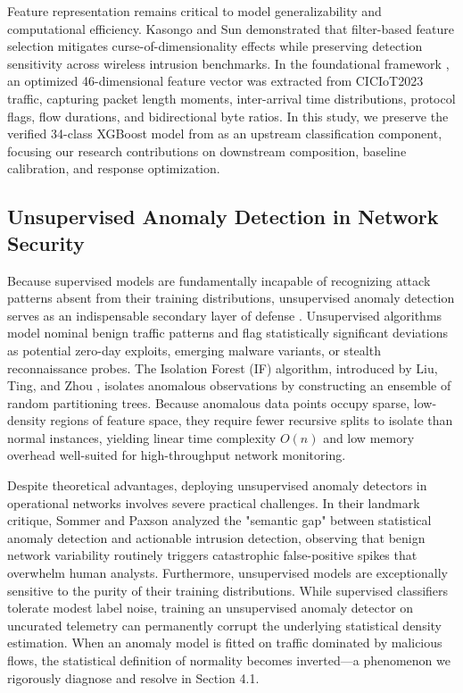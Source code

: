 \documentclass[journal,10pt,onecolumn]{IEEEtran}
\begin{document}
Feature representation remains critical to model generalizability and computational efficiency. Kasongo and Sun \cite{23} demonstrated that filter-based feature selection mitigates curse-of-dimensionality effects while preserving detection sensitivity across wireless intrusion benchmarks. In the foundational framework \cite{1}, an optimized 46-dimensional feature vector was extracted from CICIoT2023 traffic, capturing packet length moments, inter-arrival time distributions, protocol flags, flow durations, and bidirectional byte ratios. In this study, we preserve the verified 34-class XGBoost model from \cite{1} as an upstream classification component, focusing our research contributions on downstream composition, baseline calibration, and response optimization.


\subsection{Unsupervised Anomaly Detection in Network Security}
Because supervised models are fundamentally incapable of recognizing attack patterns absent from their training distributions, unsupervised anomaly detection serves as an indispensable secondary layer of defense \cite{15}. Unsupervised algorithms model nominal benign traffic patterns and flag statistically significant deviations as potential zero-day exploits, emerging malware variants, or stealth reconnaissance probes. The Isolation Forest (IF) algorithm, introduced by Liu, Ting, and Zhou \cite{15}, isolates anomalous observations by constructing an ensemble of random partitioning trees. Because anomalous data points occupy sparse, low-density regions of feature space, they require fewer recursive splits to isolate than normal instances, yielding linear time complexity $O(n)$ and low memory overhead well-suited for high-throughput network monitoring.

Despite theoretical advantages, deploying unsupervised anomaly detectors in operational networks involves severe practical challenges. In their landmark critique, Sommer and Paxson \cite{16} analyzed the "semantic gap" between statistical anomaly detection and actionable intrusion detection, observing that benign network variability routinely triggers catastrophic false-positive spikes that overwhelm human analysts. Furthermore, unsupervised models are exceptionally sensitive to the purity of their training distributions. While supervised classifiers tolerate modest label noise, training an unsupervised anomaly detector on uncurated telemetry can permanently corrupt the underlying statistical density estimation. When an anomaly model is fitted on traffic dominated by malicious flows, the statistical definition of normality becomes inverted—a phenomenon we rigorously diagnose and resolve in Section 4.1.
\end{document}
